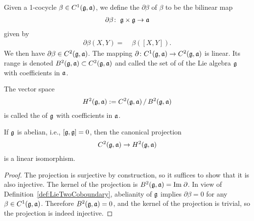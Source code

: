 \begin{definition}
  \label{def:LieTwoCoboundary}
  \leanok
  Given a 1-cocycle $\beta \in C^1(\mathfrak{g}, \mathfrak{a})$, we define the
   $\partial \beta$ of $\beta$ to be the bilinear map
  \begin{align*}
    \partial \beta \colon \; & \mathfrak{g} \times \mathfrak{g} \to \mathfrak{a} \\
  \end{align*}
  given by
  \begin{align*}
    \partial \beta (X, Y) = \; & \beta ([X,Y]) .
  \end{align*}
  We then have $\partial \beta \in C^2(\mathfrak{g},\mathfrak{a})$.
  The mapping $\partial \colon C^1(\mathfrak{g},\mathfrak{a}) \to C^2(\mathfrak{g},\mathfrak{a})$
  is linear. Its range is denoted $B^2(\mathfrak{g},\mathfrak{a}) \subset C^2(\mathfrak{g},\mathfrak{a})$
  and called the set of  of the Lie algebra $\mathfrak{g}$
  with coefficients in $\mathfrak{a}$.
\end{definition}

\begin{definition}
  \label{def:LieTwoCohomology}
  \leanok
  The vector space
  \begin{align*}
    H^2(\mathfrak{g},\mathfrak{a}) := C^2(\mathfrak{g},\mathfrak{a}) \, / \, B^2(\mathfrak{g},\mathfrak{a})
  \end{align*}
  is called the  of $\mathfrak{g}$
  with coefficients in $\mathfrak{a}$.
\end{definition}

\begin{lemma}
  \label{LieTwoCohomology_abelian}
  \leanok
  If $\mathfrak{g}$ is abelian, i.e., $[\mathfrak{g},\mathfrak{g}] = 0$, then
  the canonical projection
  \begin{align*}
    C^2(\mathfrak{g},\mathfrak{a}) \to H^2(\mathfrak{g},\mathfrak{a})
  \end{align*}
  is a linear isomorphism.
\end{lemma}
\begin{proof}
  \leanok
  The projection is surjective by construction, so it suffices to show that it is also injective.
  The kernel of the projection is $B^2(\mathfrak{g},\mathfrak{a}) = \mathrm{Im} \; \partial$.
  In view of Definition~\ref{def:LieTwoCoboundary},
  abelianity of $\mathfrak{g}$ implies $\partial \beta = 0$ for any $\beta \in C^1(\mathfrak{g},\mathfrak{a})$.
  Therefore $B^2(\mathfrak{g},\mathfrak{a}) = 0$, and the kernel of the projection is trivial,
  so the projection is indeed injective.
\end{proof}
